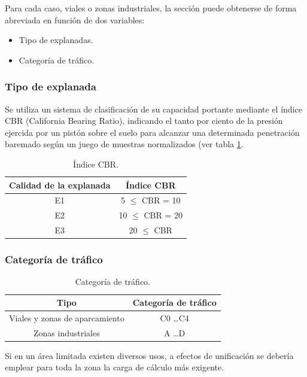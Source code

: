 Para cada caso, viales o zonas industriales, la sección puede obtenerse de forma abreviada en función de dos variables:
\begin{itemize}
\item Tipo de explanadas.
\item Categoría de tráfico.
\end{itemize}

\subsubsection{Tipo de explanada}

Se utiliza un sistema de clasificación de su capacidad portante mediante el índice CBR (California Bearing Ratio), indicando el tanto por ciento de la presión ejercida por un pistón sobre el suelo para alcanzar una determinada penetración baremado según un juego de muestras normalizados (ver tabla \ref{indicecbr}.

\begin{table}[!htb]
\centering
\begin{tabular}{cc}
\toprule
Calidad de la explanada & Índice CBR\\
\midrule
E1 & 5 $\leq$ CBR = 10\\
E2 & 10 $\leq$ CBR = 20\\
E3 & 20 $\leq$ CBR\\
\bottomrule
\end{tabular}
\caption{Índice CBR.}
\label{indicecbr}
\end{table}


\subsubsection{Categoría de tráfico}

\begin{table}[!htb]
\centering
\begin{tabular}{cc}
\toprule
Tipo & Categoría de tráfico\\
\midrule
Viales y zonas de aparcamiento & C0 \ldots C4\\
Zonas industriales & A \ldots D\\
\bottomrule
\end{tabular}
\caption{Categoría de tráfico.}
\label{categoriadetrafico}
\end{table}

Si en un área limitada existen diversos usos, a efectos de unificación se debería emplear para toda la zona la carga de cálculo más exigente.

